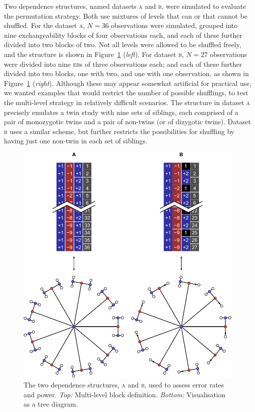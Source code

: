 Two dependence structures, named datasets \textsc{a} and \textsc{b}, were simulated to evaluate the permutation strategy. Both use mixtures of levels that can or that cannot be shuffled. For the dataset \textsc{a}, $N=36$ observations were simulated, grouped into nine exchangeability blocks of four observations each, and each of these further divided into two blocks of two. Not all levels were allowed to be shuffled freely, and the structure is shown in Figure~\ref{fig:treesAB} (\emph{left}). For dataset \textsc{b}, $N=27$ observations were divided into nine \textsc{eb}s of three observations each; and each of these further divided into two blocks, one with two, and one with one observation, as shown in Figure~\ref{fig:treesAB} (\emph{right}). Although these may appear somewhat artificial for practical use, we wanted examples that would restrict the number of possible shufflings, to test the multi-level strategy in relatively difficult scenarios. The structure in dataset \textsc{a} precisely emulates a twin study with nine sets of siblings, each comprised of a pair of monozygotic twins and a pair of non-twins (or of dizygotic twins). Dataset \textsc{b} uses a similar scheme, but further restricts the possibilities for shuffling by having just one non-twin in each set of siblings.

\begin{figure}[!tp]
\centering
\includegraphics{figures/treesAB.pdf}
\vspace{1cm}
\caption[The two simulated dependence structures used to assess error rates and power.]{The two dependence structures, \textsc{a} and \textsc{b}, used to assess error rates and power.
\emph{Top:} Multi-level block definition.
\emph{Bottom:} Visualisation as a tree diagram.} 
\label{fig:treesAB}
\end{figure}

